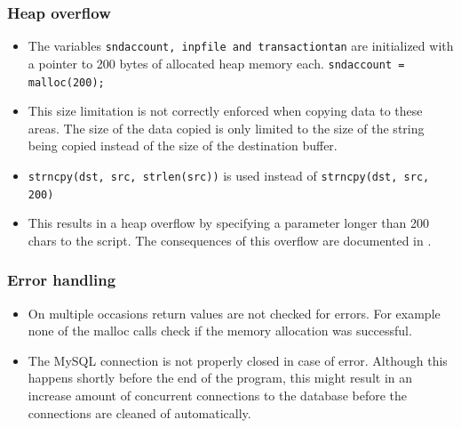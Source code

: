 \subsubsection*{Heap overflow}
\begin{itemize}
	\item The variables \texttt{sndaccount, inpfile and transactiontan}
		are initialized with a pointer to 200 bytes of allocated heap
		memory each. \newline
		\texttt{sndaccount = malloc(200);}
	\item This size limitation is not correctly enforced when copying data to
		these areas. The size of the data copied is only limited to the size of
		the string being copied instead of the size of the destination buffer.
	\item \texttt{strncpy(dst, src, strlen(src))} is used instead of \newline
		\texttt{strncpy(dst, src, 200)}
	\item This results in a heap overflow by specifying a parameter longer than
		200 chars to the script. The consequences of this overflow are
		documented in .
\end{itemize}

\subsubsection*{Error handling}
\begin{itemize}
	\item On multiple occasions return values are not checked for
		errors. For example none of the malloc calls check if the
		memory allocation was successful.
	\item The MySQL connection is not properly closed in case of error.
		Although this happens shortly before the end of the program,
		this might result in an increase amount of concurrent
		connections to the database before the connections are cleaned
		of automatically.
\end{itemize}
